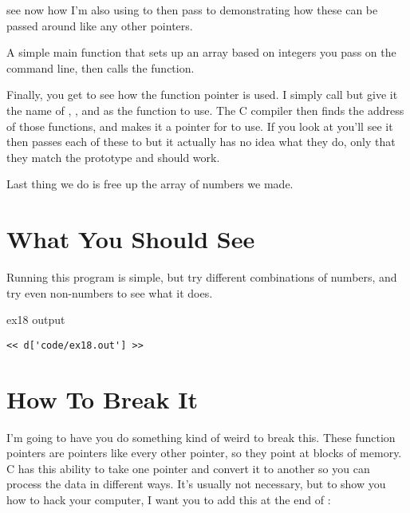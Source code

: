 \begin{description}
    see now how I'm also using  to then pass to 
    demonstrating how these can be passed around like any other pointers.
\item[ex18.c:90-103] A simple main function that sets up an array based on integers
    you pass on the command line, then calls the  function.
\item[ex18.c:105-107] Finally, you get to see how the  function
    pointer  is used.  I simply call  but
    give it the name of , , and 
     as the function to use.  The C compiler then finds
    the address of those functions, and makes it a pointer for 
     to use.  If you look at  you'll
    see it then passes each of these to  but it actually
    has no idea what they do, only that they match the  
    prototype and should work.
\item[ex18.c:109] Last thing we do is free up the array of numbers we made.
\end{description}


\section{What You Should See}

Running this program is simple, but try different combinations of numbers, and
try even non-numbers to see what it does.

\begin{code}{ex18 output}
\begin{lstlisting}
<< d['code/ex18.out'] >>
\end{lstlisting}
\end{code}


\section{How To Break It}

I'm going to have you do something kind of weird to break this.  These function
pointers are pointers like every other pointer, so they point at blocks of
memory.  C has this ability to take one pointer and convert it to another so
you can process the data in different ways.  It's usually not necessary, but
to show you how to hack your computer, I want you to add this at the end of
:

